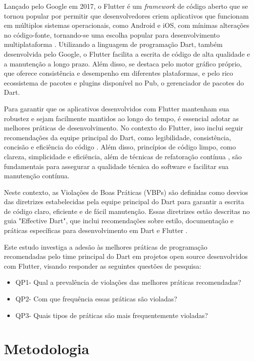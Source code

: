 \documentclass[12pt]{article}
\begin{document}
Lançado pelo Google em 2017, o Flutter é um \textit{framework} de código aberto que se tornou popular por permitir que desenvolvedores criem aplicativos que funcionam em múltiplos sistemas operacionais, como Android e iOS, com mínimas alterações no código-fonte, tornando-se uma escolha popular para desenvolvimento multiplataforma \cite{flutter}. Utilizando a linguagem de programação Dart, também desenvolvida pelo Google, o Flutter facilita a escrita de código de alta qualidade e a manutenção a longo prazo. Além disso, se destaca pelo motor gráfico próprio, que oferece consistência e desempenho em diferentes plataformas, e pelo rico ecossistema de pacotes e plugins disponível no Pub, o gerenciador de pacotes do Dart.

Para garantir que os aplicativos desenvolvidos com Flutter mantenham sua robustez e sejam facilmente mantidos ao longo do tempo, é essencial adotar as melhores práticas de desenvolvimento. No contexto do Flutter, isso inclui seguir recomendações da equipe principal do Dart, como legibilidade, consistência, concisão e eficiência do código \cite{dartBestPractices}. Além disso, princípios de código limpo, como clareza, simplicidade e eficiência, além de técnicas de refatoração contínua \cite{fowler1999refactoring}, são fundamentais para assegurar a qualidade técnica do software e facilitar sua manutenção contínua.

Neste contexto, as Violações de Boas Práticas (VBPs) são definidas como desvios das diretrizes estabelecidas pela equipe principal do Dart para garantir a escrita de código claro, eficiente e de fácil manutenção. Essas diretrizes estão descritas no guia "Effective Dart", que inclui recomendações sobre estilo, documentação e práticas específicas para desenvolvimento em Dart e Flutter \cite{dartBestPractices}.

Este estudo investiga a adesão às melhores práticas de programação recomendadas pelo time principal do Dart em projetos open source desenvolvidos com Flutter, visando responder as seguintes questões de pesquisa:
\begin{itemize}    
\item QP1- Qual a prevalência de violações das melhores práticas recomendadas?
\item QP2- Com que frequência essas práticas são violadas?
\item QP3- Quais tipos de práticas são mais frequentemente violadas?
\end{itemize}

\section{Metodologia}
\end{document}
